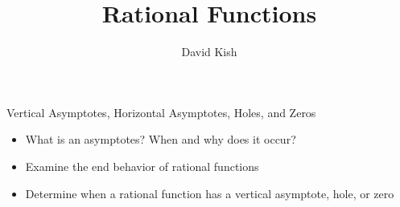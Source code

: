 \documentclass{ximera}
\author{David Kish}
\title{Rational Functions}
\begin{document}
\begin{abstract}
\end{abstract}
\maketitle


\begin{objectives}

\item Vertical Asymptotes, Horizontal Asymptotes, Holes, and Zeros
\begin{itemize}
	\item What is an asymptotes?  When and why does it occur?
	\item Examine the end behavior of rational functions
	\item Determine when a rational function has a vertical asymptote, hole, or zero
\end{itemize}


\end{objectives}
\end{document}
